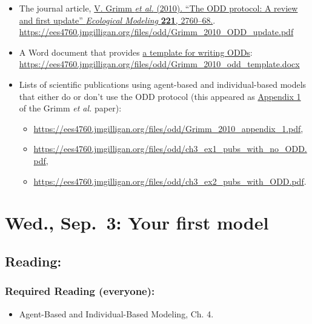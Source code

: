 \documentclass[
]{article}
\providecommand{\tightlist}{%
  \setlength{\itemsep}{0pt}\setlength{\parskip}{0pt}}
\begin{document}
\begin{itemize}
\tightlist
\item
  The journal article, \href{/files/odd/Grimm_2010_ODD_update.pdf}{V.
  Grimm \emph{et al.} (2010). ``The ODD protocol: A review and first
  update'' \emph{Ecological Modeling} \textbf{221}, 2760--68.}.
  \url{https://ees4760.jmgilligan.org/files/odd/Grimm_2010_ODD_update.pdf}
\item
  A Word document that provides
  \href{/files/odd/Grimm_2010_odd_template.docx}{a template for writing
  ODDs}:
  \url{https://ees4760.jmgilligan.org/files/odd/Grimm_2010_odd_template.docx}
\item
  Lists of scientific publications using agent-based and
  individual-based models that either do or don't use the ODD protocol
  (this appeared as \href{/files/odd/Grimm_2010_appendix_1.pdf}{Appendix
  1} of the Grimm \emph{et al.} paper):

  \begin{itemize}
  \tightlist
  \item
    \url{https://ees4760.jmgilligan.org/files/odd/Grimm_2010_appendix_1.pdf},
  \item
    \url{https://ees4760.jmgilligan.org/files/odd/ch3_ex1_pubs_with_no_ODD.pdf},
  \item
    \url{https://ees4760.jmgilligan.org/files/odd/ch3_ex2_pubs_with_ODD.pdf}.
  \end{itemize}
\end{itemize}

\section{Wed., Sep.~3: Your first
model}\label{wed.-sep.-3-your-first-model}

\subsection{Reading:}\label{reading-4}

\subsubsection{Required Reading
(everyone):}\label{required-reading-everyone-3}

\begin{itemize}
\tightlist
\item
  Agent-Based and Individual-Based Modeling, Ch. 4.
\end{itemize}
\end{document}
